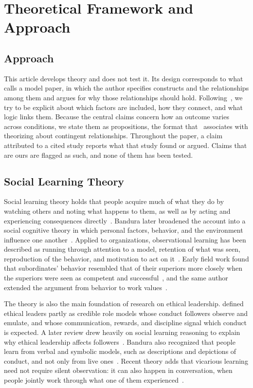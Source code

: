 \section{Theoretical Framework and Approach}
\subsection{Approach}

This article develops theory and does not test it. Its design corresponds to what~\citet{jaakkola2020designing} calls a model paper, in which the author specifies constructs and the relationships among them and argues for why those relationships should hold. Following~\citet{whetten1989constitutes}, we try to be explicit about which factors are included, how they connect, and what logic links them. Because the central claims concern how an outcome varies across conditions, we state them as propositions, the format that~\citet{cornelissen2017developing} associates with theorizing about contingent relationships. Throughout the paper, a claim attributed to a cited study reports what that study found or argued. Claims that are ours are flagged as such, and none of them has been tested.

\subsection{Social Learning Theory}

Social learning theory holds that people acquire much of what they do by watching others and noting what happens to them, as well as by acting and experiencing consequences directly~\citep{bandura1977social}. Bandura later broadened the account into a social cognitive theory in which personal factors, behavior, and the environment influence one another~\citep{bandura1986social}. Applied to organizations, observational learning has been described as running through attention to a model, retention of what was seen, reproduction of the behavior, and motivation to act on it~\citep{manz1981vicarious}. Early field work found that subordinates' behavior resembled that of their superiors more closely when the superiors were seen as competent and successful~\citep{weiss1977subordinate}, and the same author extended the argument from behavior to work values~\citep{weiss1978social}.

The theory is also the main foundation of research on ethical leadership. \citet{brown2005ethical} defined ethical leaders partly as credible role models whose conduct followers observe and emulate, and whose communication, rewards, and discipline signal which conduct is expected. A later review drew heavily on social learning reasoning to explain why ethical leadership affects followers~\citep{brown2006ethical}. Bandura also recognized that people learn from verbal and symbolic models, such as descriptions and depictions of conduct, and not only from live ones~\citep{bandura1977social}. Recent theory adds that vicarious learning need not require silent observation: it can also happen in conversation, when people jointly work through what one of them experienced~\citep{myers2018coactive}.

